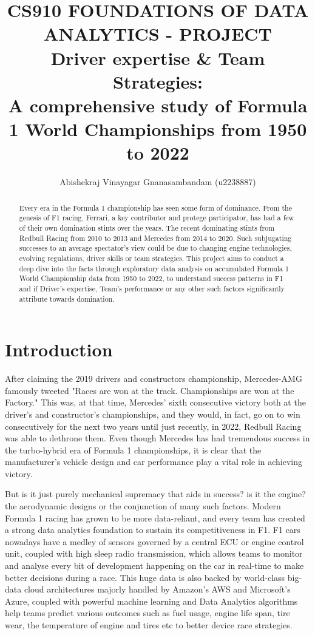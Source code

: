\documentclass[10pt,twocolumn,letterpaper]{article}
\title{
		\usefont{OT1}{bch}{b}{n}
		\normalfont \normalsize \textsc{CS910 FOUNDATIONS OF DATA ANALYTICS - PROJECT} \\ [14pt]
		\huge \textbf{Driver expertise \& Team Strategies: }\\
            \huge A comprehensive study of Formula 1 World Championships from 1950 to 2022
}
\author{Abishekraj Vinayagar Gnanasambandam (u2238887)}
\affil{\small{Department of Comuputer Science, University of Warwick}}
\begin{document}
\maketitle

\begin{abstract}
Every era in the Formula 1 championship has seen some form of dominance. From the genesis of F1 racing, Ferrari, a key contributor and protege participator, has had a few of their own domination stints over the years. The recent dominating stints from Redbull Racing from 2010 to 2013 and Mercedes from 2014 to 2020. Such subjugating successes to an average spectator's view could be due to changing engine technologies, evolving regulations, driver skills or team strategies. This project aims to conduct a deep dive into the facts through exploratory data analysis on accumulated Formula 1 World Championship data from 1950 to 2022, to understand success patterns in F1 and if Driver's expertise, Team's performance or any other such factors significantly attribute towards domination. 
\end{abstract} 


\section{Introduction}
After claiming the 2019 drivers and constructors championship, Mercedes-AMG famously tweeted \cite{merctweet} "Races are won at the track. Championships are won at the Factory." This was, at that time, Mercedes' sixth consecutive victory both at the driver's and constructor's championships, and they would, in fact, go on to win consecutively for the next two years until just recently, in 2022, Redbull Racing was able to dethrone them. Even though Mercedes has had tremendous success in the turbo-hybrid era of Formula 1 championships, it is clear that the manufacturer’s vehicle design and car performance play a vital role in achieving victory.

But is it just purely mechanical supremacy that aids in success? is it the engine? the aerodynamic designs or the conjunction of many such factors. Modern Formula 1 racing has grown to be more data-reliant, and every team has created a strong data analytics foundation to sustain its competitiveness in F1. F1 cars nowadays have a medley of sensors governed by a central ECU or engine control unit, coupled with high sleep radio transmission, which allows teams to monitor and analyse every bit of development happening on the car in real-time to make better decisions during a race. This huge data is also backed by world-class big-data cloud architectures majorly handled by Amazon's AWS and Microsoft's Azure, coupled with powerful machine learning and Data Analytics algorithms help teams predict various outcomes such as fuel usage, engine life span, tire wear, the temperature of engine and tires etc to better device race strategies.
\end{document}
